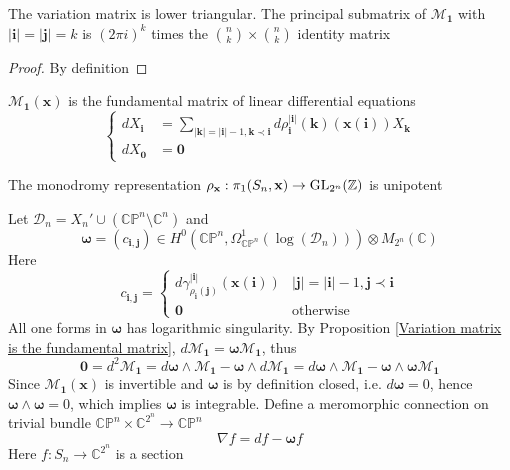 \documentclass[main]{subfiles}
\begin{document}
\begin{lemma}\label{Variation matrix of multiple logarithm is lower triangular ans principal submatrix is a scalar matrix}
The variation matrix is lower triangular. The principal submatrix of $\mathcal M_{\mathbf 1}$ with $|\mathbf i|=|\mathbf j|=k$ is $(2\pi i)^k$ times the $\binom{n}{k}\times\binom{n}{k}$ identity matrix
\end{lemma}

\begin{proof}
By definition
\end{proof}

\begin{proposition}\label{Variation matrix is the fundamental matrix}
$\mathcal M_{\mathbf1}(\mathbf x)$ is the fundamental matrix of linear differential equations
\[\begin{cases}
dX_{\mathbf i}&=\displaystyle\sum_{|\mathbf k|=|\mathbf i|-1,\mathbf k\prec\mathbf i}d\rho^{|\mathbf i|}_{\mathbf i}(\mathbf k)(\mathbf x(\mathbf i))X_{\mathbf k} \\
dX_{\mathbf0}&=\mathbf0
\end{cases}\]
\end{proposition}

\begin{theorem}

\end{theorem}

\begin{corollary}
The monodromy representation $\rho_{\mathbf x}:\pi_1(S_n,\mathbf x)\to\operatorname{GL}_{2^n}(\mathbb Z)$ is unipotent
\end{corollary}

\begin{definition}
Let $\mathcal D_n=X_n'\cup(\mathbb{CP}^n\setminus\mathbb{C}^n)$ and
\[\bm{\omega}=(c_{\mathbf{i,j}})\in H^0(\mathbb{CP}^n,\Omega_{\mathbb{CP}^n}^1(\log(\mathcal D_n)))\otimes M_{2^n}(\mathbb C)\]
Here
\[c_{\mathbf{i,j}}=\begin{cases}
d\gamma^{|\mathbf i|}_{\rho_{\mathbf i}(\mathbf j)}(\mathbf x(\mathbf i))&|\mathbf j|=|\mathbf i|-1, \mathbf j\prec\mathbf i \\
\mathbf 0&\text{otherwise}
\end{cases}\]
All one forms in $\bm\omega$ has logarithmic singularity.
By Proposition \ref{Variation matrix is the fundamental matrix}, $d\mathcal M_{\mathbf1}=\bm\omega\mathcal M_{\mathbf1}$, thus
\[\mathbf 0=d^2\mathcal M_{\mathbf1}=d\bm\omega\wedge\mathcal M_{\mathbf 1}-\bm\omega \wedge d\mathcal M_{\mathbf 1}=d\bm\omega\wedge\mathcal M_{\mathbf 1}-\bm\omega \wedge \bm\omega\mathcal M_{\mathbf 1}\]
Since $\mathcal M_{\mathbf1}(\mathbf x)$ is invertible and $\bm\omega$ is by definition closed, i.e. $d\bm\omega=0$, hence $\bm\omega\wedge\bm\omega=0$, which implies $\bm\omega$ is integrable. Define a meromorphic connection on trivial bundle $\mathbb {CP}^n\times\mathbb C^{2^n}\to\mathbb{CP}^n$
\[\nabla f=df-\bm\omega f\]
Here $f:S_n\to\mathbb C^{2^n}$ is a section
\end{definition}
\end{document}
